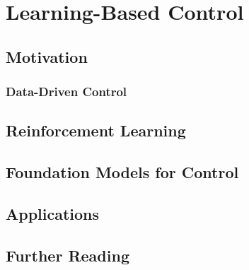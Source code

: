 \chapter{Learning-Based Control} \label{ch:learning}

	\section{Motivation}

	\subsection{Data-Driven Control}

	\section{Reinforcement Learning}

	\section{Foundation Models for Control}

	\section{Applications}

	\section{Further Reading}